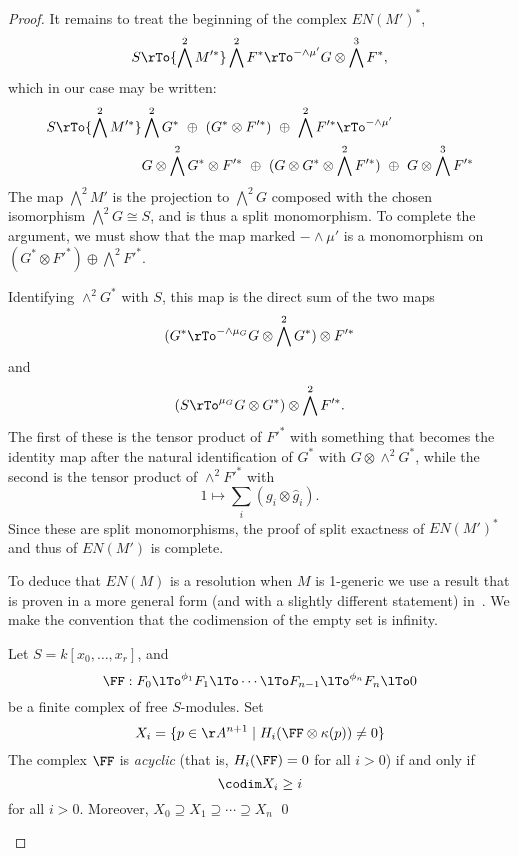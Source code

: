 \begin{proof}
It remains to treat the beginning of the complex $EN(M')^*$,
$$
S \rTo{\bigwedge^2 M'^*} 
 \bigwedge^2 F^*
 \rTo^{-\wedge \mu'}
G\otimes \bigwedge^3 F^*,
$$
which in our case may be written:
\begin{align*}
S \rTo{\bigwedge^2 M'^*} 
 &\bigwedge^2 G^* \ \oplus\ (G^*\otimes F'^*)\ \oplus\ \bigwedge^2 F'^*
 \rTo^{-\wedge \mu'} \\
 &G\otimes \bigwedge^2 G^*\otimes F'^*\ \oplus\ (G\otimes G^*\otimes \bigwedge^2 F'^*)\ \oplus\ G\otimes \bigwedge^3 F'^*
\end{align*}
The map $\bigwedge^2 M'$ is the projection to $\bigwedge^2 G$ composed with the chosen isomorphism
$\bigwedge^2 G \cong S$, and is thus a split monomorphism. To complete the argument, we must show that
 the map marked $-\wedge \mu'$ is a monomorphism on $(G^*\otimes F'^*) \oplus \bigwedge^2 F'^*$.
 
 Identifying $\wedge^2 G^*$ with $S$, this map is the direct sum of the two maps
  $$
 (G^* \rTo^{-\wedge \mu_G} G\otimes \bigwedge^2 G^*)  \otimes F'^*
 $$
 and
 $$
(S  \rTo^{\mu_G} G\otimes G^*) \otimes \bigwedge^2 F'^*.
 $$
 The first of these is the tensor product of $F'^*$ with
 something that becomes the identity map after the natural identification of $G^*$ with $G\otimes \wedge^2 G^*$,
 while the second is the tensor product of $\wedge^2 F'^*$ with
  $$
 1 \mapsto \sum_i(g_i\otimes \widehat g_i).
 $$
Since these are split monomorphisms,
the proof of split exactness of $EN(M')^*$ and thus of $EN(M')$ is complete.

To deduce that $EN(M)$ is a resolution when $M$ is 1-generic we use
a result that is proven in a more general form (and with a slightly different statement) 
in~\cite[Theorem 20.9]{Eisenbud1995}. We make the convention
that the codimension of the empty set is infinity.

\begin{theorem}\label{WMACE}
 Let $S = k[x_0,\dots, x_r]$, and
 $$ 
\FF:  F_0\lTo^{\phi_1}F_1 \lTo \cdots \lTo F_{n-1}\lTo^{\phi_n} F_n\lTo 0
 $$
be a finite complex of free $S$-modules. Set
$$
X_i = \{p\in \AA^{n+1} \mid  H_i(\FF \otimes \kappa(p)) \neq 0\}
$$
The complex $\FF$ is \emph{acyclic} (that is, $H_i(\FF) = 0$ for all $i>0$) if and only if
$$
\codim X_i \geq i
$$
for all $i>0$. Moreover, $X_{0}\supseteq X_{1}\supseteq \cdots \supseteq X_{n}$
\qed
\end{theorem}


\end{proof}
